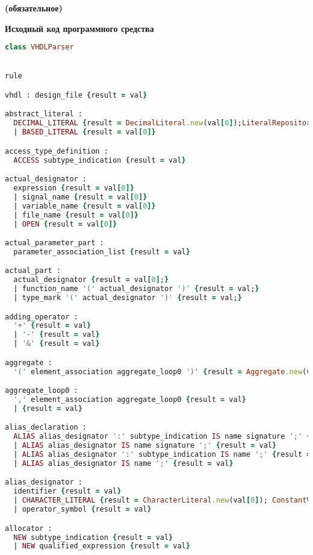

\begin{center}
\vspace{-1em}
\textbf{ (обязательное)}

\textbf{Исходный код программного средства}
\end{center}


  \begin{lstlisting}[language=Ruby, style=rubystyle]
class VHDLParser


rule

vhdl : design_file {result = val}

abstract_literal :
  DECIMAL_LITERAL {result = DecimalLiteral.new(val[0]);LiteralRepository.add(result);}
  | BASED_LITERAL {result = val[0]}

access_type_definition :
  ACCESS subtype_indication {result = val}

actual_designator :
  expression {result = val[0]}
  | signal_name {result = val[0]}
  | variable_name {result = val[0]}
  | file_name {result = val[0]}
  | OPEN {result = val[0]}

actual_parameter_part :
  parameter_association_list {result = val}

actual_part :
  actual_designator {result = val[0];}
  | function_name '(' actual_designator ')' {result = val;}
  | type_mark '(' actual_designator ')' {result = val;}

adding_operator :
  '+' {result = val}
  | '-' {result = val}
  | '&' {result = val}

aggregate :
  '(' element_association aggregate_loop0 ')' {result = Aggregate.new(val[1..2].flatten);}

aggregate_loop0 :
  ',' element_association aggregate_loop0 {result = val}
  | {result = val}

alias_declaration :
  ALIAS alias_designator ':' subtype_indication IS name signature ';' {result = val}
  | ALIAS alias_designator IS name signature ';' {result = val}
  | ALIAS alias_designator ':' subtype_indication IS name ';' {result = val}
  | ALIAS alias_designator IS name ';' {result = val}

alias_designator :
  identifier {result = val}
  | CHARACTER_LITERAL {result = CharacterLiteral.new(val[0]); ConstantValueRepository.add(result); }
  | operator_symbol {result = val}

allocator :
  NEW subtype_indication {result = val}
  | NEW qualified_expression {result = val}


\end{lstlisting}
